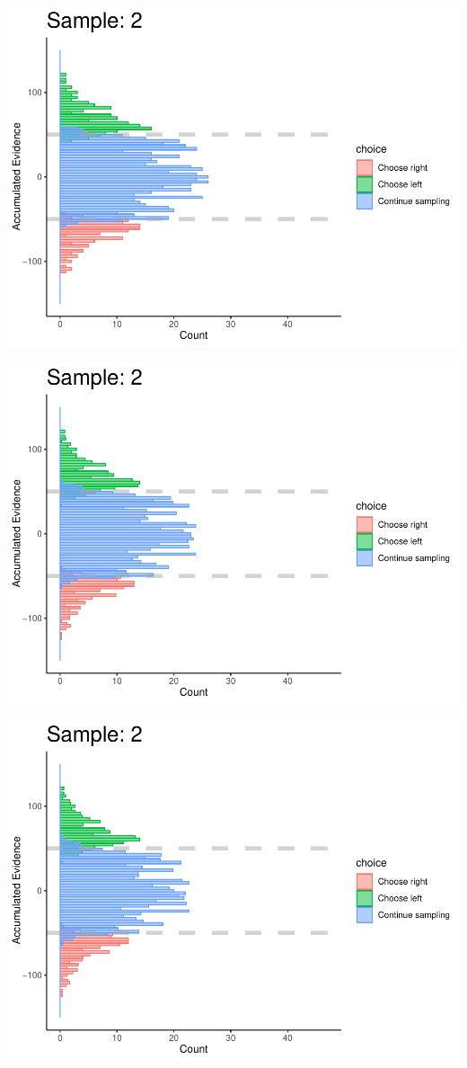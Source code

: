 \documentclass[
]{book}
\begin{document}
\begin{center}\includegraphics[width=0.8\linewidth]{LateNightBayes_files/figure-latex/fixed_check-16} \end{center}

\begin{center}\includegraphics[width=0.8\linewidth]{LateNightBayes_files/figure-latex/fixed_check-17} \end{center}

\begin{center}\includegraphics[width=0.8\linewidth]{LateNightBayes_files/figure-latex/fixed_check-18} \end{center}
\end{document}
